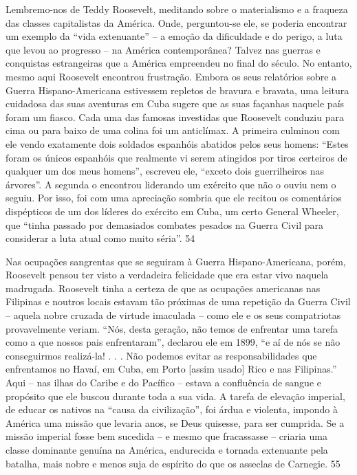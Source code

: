 \par
 
Lembremo-nos de Teddy Roosevelt, meditando sobre o materialismo e a fraqueza das classes capitalistas da América. Onde, perguntou-se ele, se poderia encontrar um exemplo da “vida extenuante” – a emoção da dificuldade e do perigo, a luta que levou ao progresso – na América contemporânea? Talvez nas guerras e conquistas estrangeiras que a América empreendeu no final do século. No entanto, mesmo aqui Roosevelt encontrou frustração. Embora os seus relatórios sobre a Guerra Hispano-Americana estivessem repletos de bravura e bravata, uma leitura cuidadosa das suas aventuras em Cuba sugere que as suas façanhas naquele país foram um fiasco. Cada uma das famosas investidas que Roosevelt conduziu para cima ou para baixo de uma colina foi um anticlímax. A primeira culminou com ele vendo exatamente dois soldados espanhóis abatidos pelos seus homens: “Estes foram os únicos espanhóis que realmente vi serem atingidos por tiros certeiros de qualquer um dos meus homens”, escreveu ele, “exceto dois guerrilheiros nas árvores”. A segunda o encontrou liderando um exército que não o ouviu nem o seguiu. Por isso, foi com uma apreciação sombria que ele recitou os comentários dispépticos de um dos líderes do exército em Cuba, um certo General Wheeler, que “tinha passado por demasiados combates pesados ​​na Guerra Civil para considerar a luta atual como muito séria”.
 {\color{blue} 54}  

 
\par
 
Nas ocupações sangrentas que se seguiram à Guerra Hispano-Americana, porém, Roosevelt pensou ter visto a verdadeira felicidade que era estar vivo naquela madrugada. Roosevelt tinha a certeza de que as ocupações americanas nas Filipinas e noutros locais estavam tão próximas de uma repetição da Guerra Civil – aquela nobre cruzada de virtude imaculada – como ele e os seus compatriotas provavelmente veriam. “Nós, desta geração, não temos de enfrentar uma tarefa como a que nossos pais enfrentaram”, declarou ele em 1899, “e aí de nós se não conseguirmos realizá-la! . . . Não podemos evitar as responsabilidades que enfrentamos no Havaí, em Cuba, em Porto [assim usado] Rico e nas Filipinas.” Aqui – nas ilhas do Caribe e do Pacífico – estava a confluência de sangue e propósito que ele buscou durante toda a sua vida. A tarefa de elevação imperial, de educar os nativos na “causa da civilização”, foi árdua e violenta, impondo à América uma missão que levaria anos, se Deus quisesse, para ser cumprida. Se a missão imperial fosse bem sucedida – e mesmo que fracassasse – criaria uma classe dominante genuína na América, endurecida e tornada extenuante pela batalha, mais nobre e menos suja de espírito do que os asseclas de Carnegie.
 {\color{blue} 55}  

